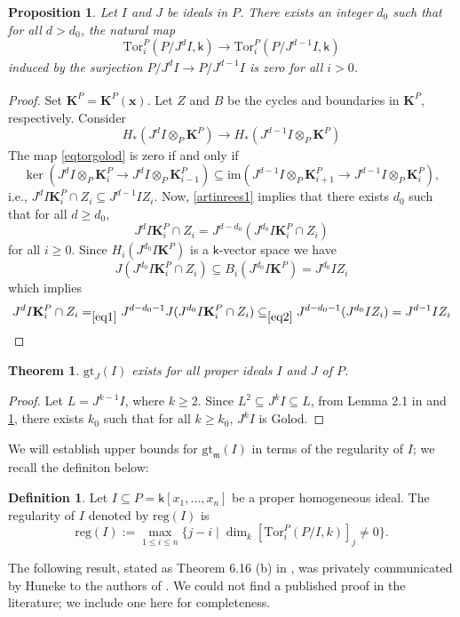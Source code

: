 \documentclass[10pt,reqno]{amsart}
\newtheorem{theorem}[subsection]{Theorem}
\newtheorem{proposition}[subsection]{Proposition}
\theoremstyle{definition}
\newtheorem{definition}[subsection]{Definition}
\theoremstyle{remark}
\numberwithin{equation}{section}
\newcommand{\Tor}{\mathrm{Tor}}
\newcommand{\reg}{\mathrm{reg}}
\newcommand{\kk}{\mathsf k}
\newcommand{\m}{\mathfrak m}
\numberwithin{equation}{section}
\begin{document}
\begin{proposition}\label{torgolod}
     Let $I$ and $J$ be ideals in $P$. There exists an integer $d_0$ such that for all $d>d_0$, the natural map \begin{equation}\label{eqtorgolod}
    \Tor_i^P(P/J^dI, \kk)\xrightarrow[]{}\Tor_i^P(P/J^{d-1}I, \kk)
    \end{equation}
    induced by the surjection $P/J^dI\xrightarrow[]{}P/J ^{d-1}I$ is zero for all $i>0$.
\end{proposition}
\begin{proof}
     Set $\mathbf K^P=\mathbf{K}^P(\mathbf{x})$. Let $Z$ and $B$ be the cycles and boundaries in $\mathbf K^P$, respectively. Consider
    \[
    H_{*}(J^dI\otimes_P \mathbf K^P)\xrightarrow[]{\;\;\;\;}H_{*}(J^{d-1}I\otimes_P \mathbf K^P)
    \] 
 The map \cref{eqtorgolod} is zero if and only if \[\ker(J^dI\otimes_P \mathbf K^P_i\xrightarrow[]{}J^dI\otimes_P \mathbf K^P_{i-1})\subseteq \mathrm{im}(J^{d-1}I\otimes_P \mathbf K^P_{i+1}\xrightarrow[]{}J^{d-1}I\otimes_P \mathbf K^P_{i}),\]
 i.e., $J^dI\mathbf K^P_i\cap Z_i\subseteq J^{d-1}IZ_i$. Now, \cref{artinrees1} implies that there exists $d_0$ such that for all $d\geq d_0$, \begin{equation}\label{eq1}
 J^dI\mathbf K^P_i\cap Z_i=J^{d-d_0}(J^{d_0}I\mathbf K^P_i\cap Z_i)   
\end{equation}
for all $i\geq 0$. Since $H_i(J^{d_0}I\mathbf K^P)$ is a $\kk$-vector space we have \begin{equation}\label{eq2}
J(J^{d_0}I\mathbf K^P_i\cap Z_i)\subseteq B_{i}(J^{d_0}I\mathbf K^P)=J^{d_0}IZ_i
\end{equation}
which implies \[
 J^dI\mathbf K^P_i\cap Z_i=_{\eqref{eq1}}J^{d-d_0-1}J(J^{d_0}I\mathbf K^P_i\cap Z_i)\subseteq_{\eqref{eq2}} J^{d-d_0-1}( J^{d_0}IZ_i)=J^{d-1}IZ_i
\] 
\end{proof}

\begin{theorem}\label{existence of golod threshold}
    $\mathrm{gt}_J(I)$ exists for all proper ideals $I$ and $J$ of $P$.
\end{theorem}
\begin{proof}
    Let $L=J^{k-1}I$, where $k\geq 2$. Since $L^2\subseteq J^kI\subseteq L$, from Lemma 2.1 in \cite{maleki2019golod} and \cref{torgolod}, there exists $k_0$ such that for all $k\geq k_0$, $J^kI$ is Golod. 
\end{proof}
 We will establish upper bounds for $\mathrm{gt}_{\m}(I)$ in terms of the regularity of $I$; we recall the definiton below: 
 \begin{definition}
     Let $I\subseteq P=\kk[x_1,\ldots,x_n]$ be a proper homogeneous ideal. The regularity of $I$ denoted by $\reg(I)$ is \[
    \reg(I):= \max_{1\leq i\leq n}\{j-i\;|\; \dim_{k}[\Tor^{P}_i(P/I,k)]_j\neq 0\}.\]
 \end{definition}
The following result, stated as Theorem 6.16 (b) in \cite{mccullough2015infinite}, was privately communicated by Huneke to the authors of \cite{mccullough2015infinite}. We could not find a published proof in the literature; we include one here for completeness. 
\end{document}
